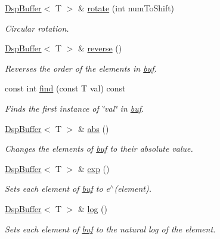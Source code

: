 \begin{DoxyCompactItemize}
\hyperlink{class_smart_dsp_1_1_dsp_buffer}{Dsp\+Buffer}$<$ T $>$ \& \hyperlink{class_smart_dsp_1_1_dsp_buffer_a1a890ef9ea24235e694573a97217c4eb}{rotate} (int num\+To\+Shift)
\begin{DoxyCompactList}\small\item\em Circular rotation. \end{DoxyCompactList}\item 
\hyperlink{class_smart_dsp_1_1_dsp_buffer}{Dsp\+Buffer}$<$ T $>$ \& \hyperlink{class_smart_dsp_1_1_dsp_buffer_a8f877fbc18d1c64e837e1a9bf7a02bbe}{reverse} ()
\begin{DoxyCompactList}\small\item\em Reverses the order of the elements in \hyperlink{class_smart_dsp_1_1_dsp_buffer_a7abb8184e08f4c9762f66bc75dcd3a6a}{buf}. \end{DoxyCompactList}\item 
const int \hyperlink{class_smart_dsp_1_1_dsp_buffer_a4cbf9ae9ee457bfde36cedbdaf26525c}{find} (const T val) const 
\begin{DoxyCompactList}\small\item\em Finds the first instance of \char`\"{}val\char`\"{} in \hyperlink{class_smart_dsp_1_1_dsp_buffer_a7abb8184e08f4c9762f66bc75dcd3a6a}{buf}. \end{DoxyCompactList}\item 
\hyperlink{class_smart_dsp_1_1_dsp_buffer}{Dsp\+Buffer}$<$ T $>$ \& \hyperlink{class_smart_dsp_1_1_dsp_buffer_a2df860e42f26ca1e261de9228b5a160a}{abs} ()
\begin{DoxyCompactList}\small\item\em Changes the elements of \hyperlink{class_smart_dsp_1_1_dsp_buffer_a7abb8184e08f4c9762f66bc75dcd3a6a}{buf} to their absolute value. \end{DoxyCompactList}\item 
\hyperlink{class_smart_dsp_1_1_dsp_buffer}{Dsp\+Buffer}$<$ T $>$ \& \hyperlink{class_smart_dsp_1_1_dsp_buffer_a0254217926a884db4baccea5d913aef8}{exp} ()
\begin{DoxyCompactList}\small\item\em Sets each element of \hyperlink{class_smart_dsp_1_1_dsp_buffer_a7abb8184e08f4c9762f66bc75dcd3a6a}{buf} to e$^\wedge$(element). \end{DoxyCompactList}\item 
\hyperlink{class_smart_dsp_1_1_dsp_buffer}{Dsp\+Buffer}$<$ T $>$ \& \hyperlink{class_smart_dsp_1_1_dsp_buffer_aecf9005a8cf2502899da5bc25ae1b650}{log} ()
\begin{DoxyCompactList}\small\item\em Sets each element of \hyperlink{class_smart_dsp_1_1_dsp_buffer_a7abb8184e08f4c9762f66bc75dcd3a6a}{buf} to the natural log of the element. \end{DoxyCompactList}\item 

\end{DoxyCompactItemize}
